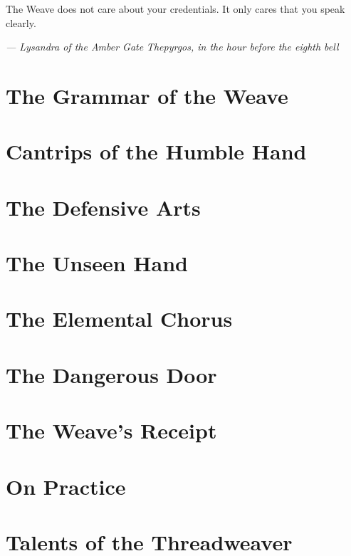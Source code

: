 \documentclass[11pt]{book}
\begin{document}
The Weave does not care about your credentials. It only cares that you speak clearly.

\textit{--- Lysandra of the Amber Gate}
\textit{Thepyrgos, in the hour before the eighth bell}

\mainmatter


\chapter{The Grammar of the Weave}


\chapter{Cantrips of the Humble Hand}


\chapter{The Defensive Arts}


\chapter{The Unseen Hand}


\chapter{The Elemental Chorus}


\chapter{The Dangerous Door}


\chapter{The Weave's Receipt}


\chapter{On Practice}


\appendix

\chapter{Talents of the Threadweaver}

\end{document}
